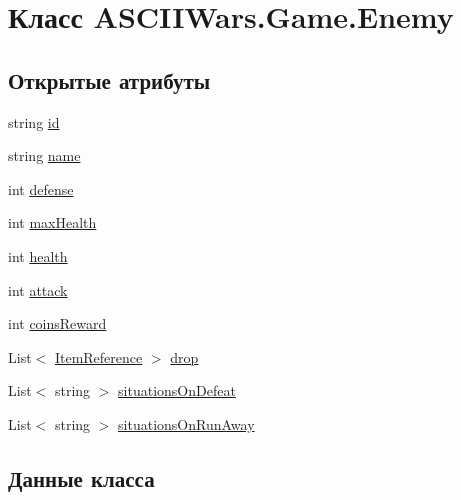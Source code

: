 \hypertarget{class_a_s_c_i_i_wars_1_1_game_1_1_enemy}{}\section{Класс A\+S\+C\+I\+I\+Wars.\+Game.\+Enemy}
\label{class_a_s_c_i_i_wars_1_1_game_1_1_enemy}
\subsection*{Открытые атрибуты}
\begin{DoxyCompactItemize}
\item 
string \hyperlink{class_a_s_c_i_i_wars_1_1_game_1_1_enemy_a4899e9443d2f01a8f95b187784ba08c9}{id}
\item 
string \hyperlink{class_a_s_c_i_i_wars_1_1_game_1_1_enemy_a50cedf172e072311d4fafa5bbe5991e5}{name}
\item 
int \hyperlink{class_a_s_c_i_i_wars_1_1_game_1_1_enemy_a5a07bdd5189ac07e2c46fab4c2ee2d32}{defense}
\item 
int \hyperlink{class_a_s_c_i_i_wars_1_1_game_1_1_enemy_a491cc3f4cf2ffe2a412411248cd9736a}{max\+Health}
\item 
int \hyperlink{class_a_s_c_i_i_wars_1_1_game_1_1_enemy_a9240cccb69253549bf7d72620a3c9171}{health}
\item 
int \hyperlink{class_a_s_c_i_i_wars_1_1_game_1_1_enemy_aa1bec7d23246d8a7ebbe547e5b0b914f}{attack}
\item 
int \hyperlink{class_a_s_c_i_i_wars_1_1_game_1_1_enemy_abc760eceff65559b850946aed3c9ee73}{coins\+Reward}
\item 
List$<$ \hyperlink{class_a_s_c_i_i_wars_1_1_game_1_1_item_reference}{Item\+Reference} $>$ \hyperlink{class_a_s_c_i_i_wars_1_1_game_1_1_enemy_ad88da17a5d3175ec7424b43a7047f621}{drop}
\item 
List$<$ string $>$ \hyperlink{class_a_s_c_i_i_wars_1_1_game_1_1_enemy_a6250d32cd64b9c25fccad4ff503856f2}{situations\+On\+Defeat}
\item 
List$<$ string $>$ \hyperlink{class_a_s_c_i_i_wars_1_1_game_1_1_enemy_aaf3d6f61b5b3bc7aad9188a0eb9795aa}{situations\+On\+Run\+Away}
\end{DoxyCompactItemize}


\subsection{Данные класса}
\hypertarget{class_a_s_c_i_i_wars_1_1_game_1_1_enemy_aa1bec7d23246d8a7ebbe547e5b0b914f}{}\label{class_a_s_c_i_i_wars_1_1_game_1_1_enemy_aa1bec7d23246d8a7ebbe547e5b0b914f} 
